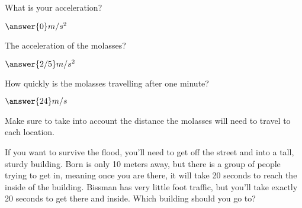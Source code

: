 \documentclass{ximera}
\begin{document}
\begin{question}
What is your acceleration?

$\answer{0}m/s^2$

The acceleration of the molasses?

$\answer{2/5}m/s^2$
\end{question}
\begin{question}
How quickly is the molasses travelling after one minute?

$\answer{24}m/s$
\end{question}
\begin{question}
\begin{hint}
Make sure to take into account the distance the molasses will need to travel to each location.
\end{hint}If you want to survive the flood, you'll need to get off the street and into a tall, sturdy building. Born is only 10 meters away, but there is a group of people trying to get in, meaning once you are there, it will take 20 seconds to reach the inside of the building. Bissman has very little foot traffic, but you'll take exactly 20 seconds to get there and inside. Which building should you go to? \begin{multipleChoice}
\end{multipleChoice}\end{question}

\setcounter{problem}{0}
\end{document}
